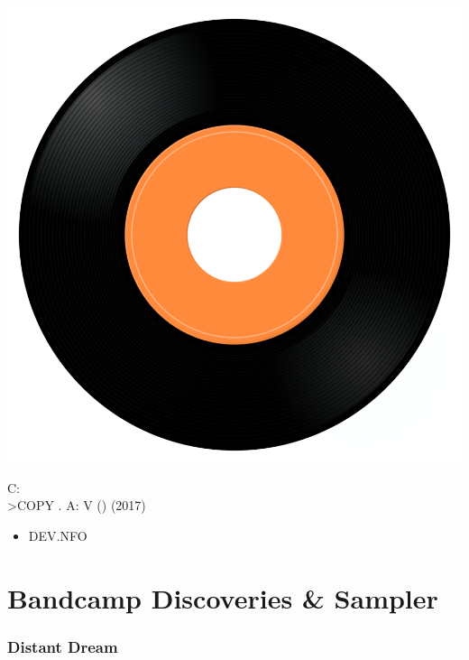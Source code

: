 \begin{minipage}[t]{0.25\textwidth}
\captionsetup{type=figure}
\includegraphics[width=\textwidth]{Images/cover.png}
\caption*{C:\\>COPY \*.\* A: \/V () (2017)}
\end{minipage}
\begin{minipage}[t]{0.25\textwidth}\vspace{0pt}
\begin{itemize}[nosep,leftmargin=1em,labelwidth=*,align=left]
	\setlength{\itemsep}{0pt}
	\item DEV.NFO
\end{itemize}
\end{minipage}


\section{Bandcamp Discoveries \& Sampler}

\subsubsection{Distant Dream}

